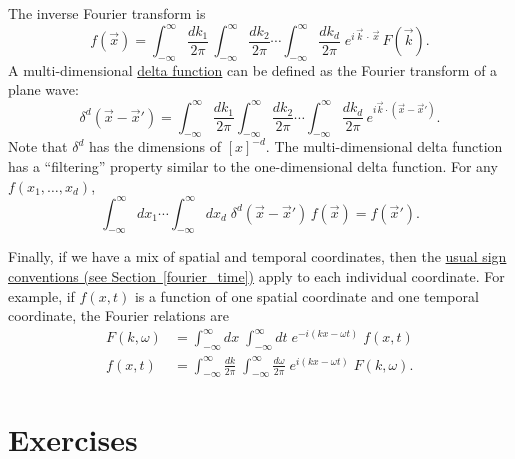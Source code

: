 \documentclass[10pt,a4paper]{article}
\begin{document}
The inverse Fourier transform is
\begin{equation}
  f(\vec{x}) = \int_{-\infty}^\infty \frac{dk_1}{2\pi}\, \int_{-\infty}^\infty
  \frac{dk_2}{2\pi} \cdots \int_{-\infty}^\infty \frac{dk_d}{2\pi}\;
  e^{i\,\vec{k}\,\cdot\,\vec{x}}\, F(\vec{k}).
\end{equation}
A multi-dimensional \hyperref[delta-function]{delta function} can be
defined as the Fourier transform of a plane wave:
\begin{equation}
  \delta^d(\vec{x}-\vec{x}') = \int_{-\infty}^\infty \frac{dk_1}{2\pi}
  \int_{-\infty}^\infty \frac{dk_2}{2\pi} \cdots \int_{-\infty}^\infty
  \frac{dk_d}{2\pi} \, e^{i\vec{k} \cdot \left(\vec{x}-\vec{x}'\right)}.
\end{equation}
Note that $\delta^d$ has the dimensions of $[x]^{-d}$. The
multi-dimensional delta function has a ``filtering'' property similar
to the one-dimensional delta function.  For any $f(x_1,\dots,x_d)$,
\begin{equation}
  \int_{-\infty}^\infty dx_1 \cdots \int_{-\infty}^\infty dx_d \; \delta^d(\vec{x}-\vec{x}')
  \, f(\vec{x}) = f(\vec{x}').
\end{equation}

Finally, if we have a mix of spatial and temporal coordinates, then
the \hyperref[fourier_time]{usual sign conventions (see
  Section~\ref{fourier_time})} apply to each individual
coordinate. For example, if $f(x,t)$ is a function of one spatial
coordinate and one temporal coordinate, the Fourier relations are
\begin{align}
  F(k, \omega) &= \int_{-\infty}^\infty dx\; \int_{-\infty}^\infty dt\;
  e^{-i(kx-\omega t)}\; f(x,t) \\
  f(x, t) &= \int_{-\infty}^\infty \frac{dk}{2\pi}\; \int_{-\infty}^\infty
  \frac{d\omega}{2\pi}\; e^{i(kx-\omega t)}\; F(k,\omega).
\end{align}

\section{Exercises}
\end{document}
